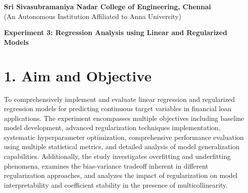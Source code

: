 \documentclass[11pt]{article}
\begin{document}
\begin{center}
\large \textbf{Sri Sivasubramaniya Nadar College of Engineering, Chennai} \\
(An Autonomous Institution Affiliated to Anna University) \\
\vspace{0.3cm}
\end{center}

\begin{table}[!h]
\renewcommand{\arraystretch}{1.5}
\end{table}

\begin{center}
\textbf{Experiment 3: Regression Analysis using Linear and Regularized Models}
\end{center}

\section*{1. Aim and Objective}
To comprehensively implement and evaluate linear regression and regularized regression models for predicting continuous target variables in financial loan applications. The experiment encompasses multiple objectives including baseline model development, advanced regularization techniques implementation, systematic hyperparameter optimization, comprehensive performance evaluation using multiple statistical metrics, and detailed analysis of model generalization capabilities. Additionally, the study investigates overfitting and underfitting phenomena, examines the bias-variance tradeoff inherent in different regularization approaches, and analyzes the impact of regularization on model interpretability and coefficient stability in the presence of multicollinearity.
\end{document}
